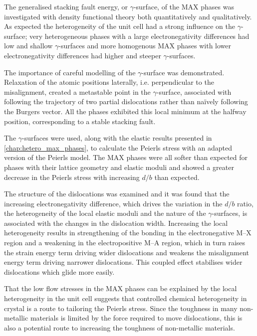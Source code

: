 The generalised stacking fault energy, or $\gamma$-surface, of the MAX phases was investigated with density functional theory both quantitatively and qualitatively. As expected the heterogeneity of the unit cell had a strong influence on the $\gamma$-surface; very heterogeneous phases with a large electronegativity differences had low and shallow $\gamma$-surfaces and more homogenous MAX phases with lower electronegativity differences had higher and steeper $\gamma$-surfaces.

The importance of careful modelling of the $\gamma$-surface was demonstrated. Relaxation of the atomic positions laterally, i.e. perpendicular to the misalignment, created a metastable point in the $\gamma$-surface, associated with following the trajectory of two partial dislocations rather than na\"{i}vely following the Burgers vector. All the phases exhibited this local minimum at the halfway position, corresponding to a stable stacking fault.

The $\gamma$-surfaces were used, along with the elastic results presented in \autoref{chap:hetero_max_phases}, to calculate the Peierls stress with an adapted version of the Peierls model. The MAX phases were all softer than expected for phases with their lattice geometry and elastic moduli and showed a greater decrease in the Peierls stress with increasing $d/b$ than expected.

The structure of the dislocations was examined and it was found that the increasing electronegativity difference, which drives the variation in the $d/b$ ratio, the heterogeneity of the local elastic moduli and the nature of the $\gamma$-surfaces, is associated with the changes in the dislocation width. Increasing the local heterogeneity results in strengthening of the bonding in the electronegative M--X region and a weakening in the electropositive M--A region, which in turn raises the strain energy term driving wider dislocations and weakens the misalignment energy term driving narrower dislocations. This coupled effect stabilises wider dislocations which glide more easily.


That the low flow stresses in the MAX phases can be explained by the local heterogeneity in the unit cell suggests that controlled chemical heterogeneity in crystal is a route to tailoring the Peierls stress. Since the toughness in many non-metallic materials is limited by the force required to move dislocations, this is also a potential route to increasing the toughness of non-metallic materials.






























